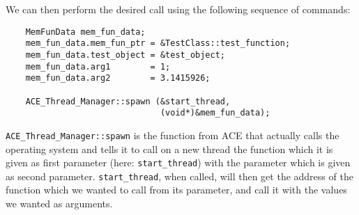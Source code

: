 \documentclass[11pt]{article}
\begin{document}
We can then perform the desired call using the following sequence of commands:
\begin{verbatim}
    MemFunData mem_fun_data;
    mem_fun_data.mem_fun_ptr = &TestClass::test_function;
    mem_fun_data.test_object = &test_object;
    mem_fun_data.arg1        = 1;
    mem_fun_data.arg2        = 3.1415926;
    
    ACE_Thread_Manager::spawn (&start_thread,
                               (void*)&mem_fun_data);
\end{verbatim}
\texttt{ACE\_Thread\_Manager::spawn} is the function from ACE that actually calls the
operating system and tells it to call on a new thread the function which it is
given as first parameter (here: \texttt{start\_thread}) with the parameter
which is given as second parameter. \texttt{start\_thread}, when called, will
then get the address of the function which we wanted to call from its
parameter, and call it with the values we wanted as arguments.
\end{document}

